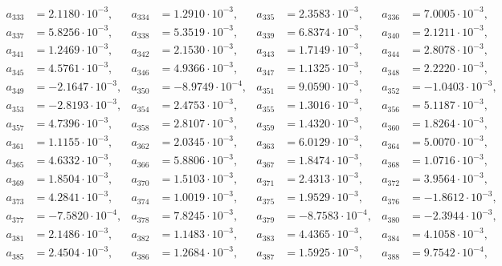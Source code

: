 \begin{align*}
a_{ 333 } &= 2.1180 \cdot 10^{ -3 }, & a_{ 334 } &= 1.2910 \cdot 10^{ -3 }, & a_{ 335 } &= 2.3583 \cdot 10^{ -3 }, & a_{ 336 } &= 7.0005 \cdot 10^{ -3 },\\ 
a_{ 337 } &= 5.8256 \cdot 10^{ -3 }, & a_{ 338 } &= 5.3519 \cdot 10^{ -3 }, & a_{ 339 } &= 6.8374 \cdot 10^{ -3 }, & a_{ 340 } &= 2.1211 \cdot 10^{ -3 },\\ 
a_{ 341 } &= 1.2469 \cdot 10^{ -3 }, & a_{ 342 } &= 2.1530 \cdot 10^{ -3 }, & a_{ 343 } &= 1.7149 \cdot 10^{ -3 }, & a_{ 344 } &= 2.8078 \cdot 10^{ -3 },\\ 
a_{ 345 } &= 4.5761 \cdot 10^{ -3 }, & a_{ 346 } &= 4.9366 \cdot 10^{ -3 }, & a_{ 347 } &= 1.1325 \cdot 10^{ -3 }, & a_{ 348 } &= 2.2220 \cdot 10^{ -3 },\\ 
a_{ 349 } &= -2.1647 \cdot 10^{ -3 }, & a_{ 350 } &= -8.9749 \cdot 10^{ -4 }, & a_{ 351 } &= 9.0590 \cdot 10^{ -3 }, & a_{ 352 } &= -1.0403 \cdot 10^{ -3 },\\ 
a_{ 353 } &= -2.8193 \cdot 10^{ -3 }, & a_{ 354 } &= 2.4753 \cdot 10^{ -3 }, & a_{ 355 } &= 1.3016 \cdot 10^{ -3 }, & a_{ 356 } &= 5.1187 \cdot 10^{ -3 },\\ 
a_{ 357 } &= 4.7396 \cdot 10^{ -3 }, & a_{ 358 } &= 2.8107 \cdot 10^{ -3 }, & a_{ 359 } &= 1.4320 \cdot 10^{ -3 }, & a_{ 360 } &= 1.8264 \cdot 10^{ -3 },\\ 
a_{ 361 } &= 1.1155 \cdot 10^{ -3 }, & a_{ 362 } &= 2.0345 \cdot 10^{ -3 }, & a_{ 363 } &= 6.0129 \cdot 10^{ -3 }, & a_{ 364 } &= 5.0070 \cdot 10^{ -3 },\\ 
a_{ 365 } &= 4.6332 \cdot 10^{ -3 }, & a_{ 366 } &= 5.8806 \cdot 10^{ -3 }, & a_{ 367 } &= 1.8474 \cdot 10^{ -3 }, & a_{ 368 } &= 1.0716 \cdot 10^{ -3 },\\ 
a_{ 369 } &= 1.8504 \cdot 10^{ -3 }, & a_{ 370 } &= 1.5103 \cdot 10^{ -3 }, & a_{ 371 } &= 2.4313 \cdot 10^{ -3 }, & a_{ 372 } &= 3.9564 \cdot 10^{ -3 },\\ 
a_{ 373 } &= 4.2841 \cdot 10^{ -3 }, & a_{ 374 } &= 1.0019 \cdot 10^{ -3 }, & a_{ 375 } &= 1.9529 \cdot 10^{ -3 }, & a_{ 376 } &= -1.8612 \cdot 10^{ -3 },\\ 
a_{ 377 } &= -7.5820 \cdot 10^{ -4 }, & a_{ 378 } &= 7.8245 \cdot 10^{ -3 }, & a_{ 379 } &= -8.7583 \cdot 10^{ -4 }, & a_{ 380 } &= -2.3944 \cdot 10^{ -3 },\\ 
a_{ 381 } &= 2.1486 \cdot 10^{ -3 }, & a_{ 382 } &= 1.1483 \cdot 10^{ -3 }, & a_{ 383 } &= 4.4365 \cdot 10^{ -3 }, & a_{ 384 } &= 4.1058 \cdot 10^{ -3 },\\ 
a_{ 385 } &= 2.4504 \cdot 10^{ -3 }, & a_{ 386 } &= 1.2684 \cdot 10^{ -3 }, & a_{ 387 } &= 1.5925 \cdot 10^{ -3 }, & a_{ 388 } &= 9.7542 \cdot 10^{ -4 },\\ 

\end{align*}
